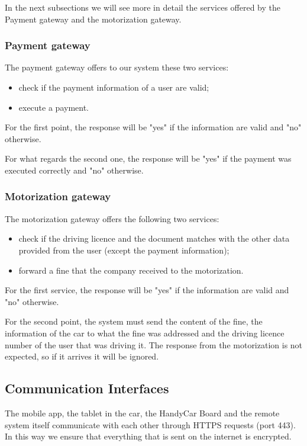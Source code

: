 In the next subsections we will see more in detail the services offered by the Payment gateway and the motorization gateway.

\subsubsection{Payment gateway}
The payment gateway offers to our system these two services:
\begin{itemize}
\item check if the payment information of a user are valid;
\item execute a payment.
\end{itemize}

For the first point, the response will be "yes" if the information are valid and "no" otherwise.

For what regards the second one, the response will be "yes" if the payment was executed correctly and "no" otherwise.

\subsubsection{Motorization gateway}
The motorization gateway offers the following two services:
\begin{itemize}
\item check if the driving licence and the document matches with the other data provided from the user (except the payment information);
\item forward a fine that the company received to the motorization.
\end{itemize}

For the first service, the response will be "yes" if the information are valid and "no" otherwise.

For the second point, the system must send the content of the fine, the information of the car to what the fine was addressed and the driving licence number of the user that was driving it. The response from the motorization is not expected, so if it arrives it will be ignored.

\subsection{Communication Interfaces}
The mobile app, the tablet in the car, the HandyCar Board and the remote system itself communicate with each other through HTTPS requests (port 443). In this way we ensure that everything that is sent on the internet is encrypted.

